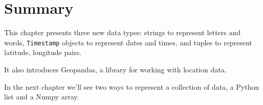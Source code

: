 \hypertarget{summary}{%
\section{Summary}\label{summary}}

This chapter presents three new data types: strings to represent letters
and words, \passthrough{\lstinline!Timestamp!} objects to represent
dates and times, and tuples to represent latitude, longitude pairs.

It also introduces Geopandas, a library for working with location data.

In the next chapter we'll see two ways to represent a collection of
data, a Python list and a Numpy array.

